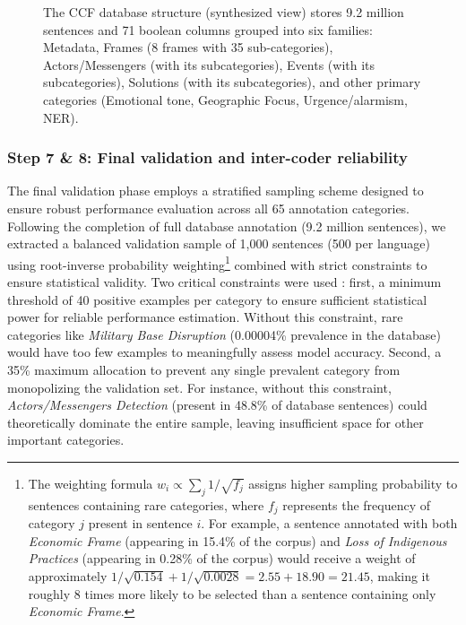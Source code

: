 \documentclass[12pt]{article}
\begin{document}
\begin{figure}[h!]
{\begin{tikzpicture}
\end{tikzpicture}
}
\caption{The CCF database structure (synthesized view) stores 9.2 million sentences and 71 boolean columns grouped into six families: Metadata, Frames (8 frames with 35 sub-categories), Actors/Messengers (with its subcategories), Events (with its subcategories), Solutions (with its subcategories), and other primary categories (Emotional tone, Geographic Focus, Urgence/alarmism, NER).}
\label{fig:database_structure}
\end{figure}

\subsubsection{Step 7 \& 8: Final validation and inter-coder reliability}

The final validation phase employs a stratified sampling scheme designed to ensure robust performance evaluation across all 65 annotation categories. Following the completion of full database annotation (9.2 million sentences), we extracted a balanced validation sample of 1,000 sentences (500 per language) using root-inverse probability weighting\footnote{The weighting formula $w_i \propto \sum_j 1/\sqrt{f_j}$ assigns higher sampling probability to sentences containing rare categories, where $f_j$ represents the frequency of category $j$ present in sentence $i$. For example, a sentence annotated with both \textit{Economic Frame} (appearing in 15.4\% of the corpus) and \textit{Loss of Indigenous Practices} (appearing in 0.28\% of the corpus) would receive a weight of approximately $1/\sqrt{0.154} + 1/\sqrt{0.0028} = 2.55 + 18.90 = 21.45$, making it roughly 8 times more likely to be selected than a sentence containing only \textit{Economic Frame}.} combined with strict constraints to ensure statistical validity. Two critical constraints were used : first, a minimum threshold of 40 positive examples per category to ensure sufficient statistical power for reliable performance estimation. Without this constraint, rare categories like \textit{Military Base Disruption} (0.00004\% prevalence in the database) would have too few examples to meaningfully assess model accuracy. Second, a 35\% maximum allocation to prevent any single prevalent category from monopolizing the validation set. For instance, without this constraint, \textit{Actors/Messengers Detection} (present in 48.8\% of database sentences) could theoretically dominate the entire sample, leaving insufficient space for other important categories.
\end{document}
